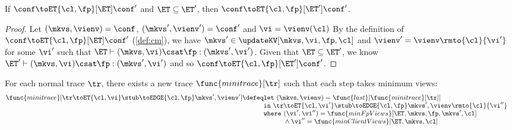 \begin{lemma}
\label{lem:mono-et}
If $\conf \toET{\cl, \fp}[\ET] \conf'$ and $\ET \subseteq \ET'$, 
then $\conf \toET{\cl, \fp}[\ET'] \conf'$.
\end{lemma}
\begin{proof}
    Let \((\mkvs, \vienv)  = \conf \), \( (\mkvs', \vienv') = \conf' \) and \( \vi  =\vienv(\cl) \)
    By the definition of  $\conf \toET{\cl, \fp}[\ET] \conf'$ (\cref{def:cm}), we have \(\mkvs' \in \updateKV[\mkvs, \vi, \fp, \cl]\) and  \( \vienv' = \vienv\rmto{\cl}{\vi'} \) for some \( \vi' \) such that \( \ET \vdash (\mkvs, \vi) \csat \fp : (\mkvs',\vi') \).
    Given that \( \ET \subseteq \ET'\), we know \( \ET' \vdash (\mkvs, \vi) \csat \fp : (\mkvs',\vi') \) and so $\conf \toET{\cl, \fp}[\ET'] \conf'$.
\end{proof}

For each normal trace \( \tr \), there exists a new trace \( \func{minitrace}[\tr] \) such that each step takes minimum views:
\begin{align*}
    \func{minitrace}[\tr \toET{\cl,\vi} \stub \toEDGE{\cl,\fp} \mkvs', \vienv'] & \defeq 
    \begin{array}[t]{@{}l@{}}
        \mathtt{let} \ (\mkvs,\vienv) = \func{last}[\func{minitrace}[\tr]]  \\
        \mathtt{in} \ \tr \toET{\cl,\vi'} \stub \toEDGE{\cl,\fp} \mkvs', \vienv\rmto{\cl}{\vi''} \\
        \mathtt{where} \ \begin{array}[t]{@{}l@{}}
            (\vi',\vi'') = \func{minFpViews}[\ET,\mkvs,\fp,\mkvs',\cl] \\
            {} \land \vi'' = \func{minClientViews}[\ET,\mkvs,\cl]
        \end{array} 
    \end{array}
\end{align*}

